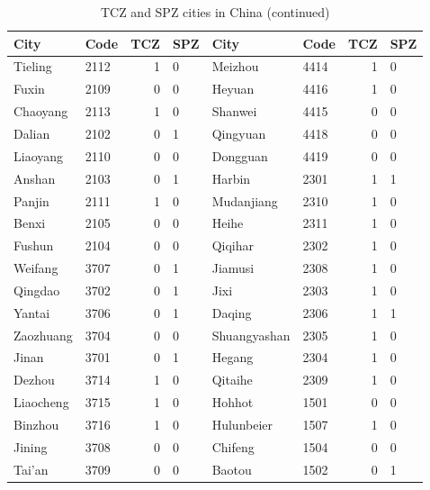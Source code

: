 \documentclass[12pt]{article}
\begin{document}
\begin{table}[!htb] \centering
  \caption{TCZ and SPZ cities in China (continued)}
  \begin{adjustbox}{width=\textwidth, totalheight=\baselineskip,keepaspectratio}
    \label{tab:appendix3}
\begin{tabular}{llrlllrl}
\hline
      City &  Code &  TCZ & SPZ &          City &  Code &  TCZ & SPZ \\
\midrule
   Tieling &  2112 &    1 &   0 &       Meizhou &  4414 &    1 &   0 \\
     Fuxin &  2109 &    0 &   0 &        Heyuan &  4416 &    1 &   0 \\
  Chaoyang &  2113 &    1 &   0 &       Shanwei &  4415 &    0 &   0 \\
    Dalian &  2102 &    0 &   1 &      Qingyuan &  4418 &    0 &   0 \\
  Liaoyang &  2110 &    0 &   0 &      Dongguan &  4419 &    0 &   0 \\
    Anshan &  2103 &    0 &   1 &        Harbin &  2301 &    1 &   1 \\
    Panjin &  2111 &    1 &   0 &    Mudanjiang &  2310 &    1 &   0 \\
     Benxi &  2105 &    0 &   0 &         Heihe &  2311 &    1 &   0 \\
    Fushun &  2104 &    0 &   0 &       Qiqihar &  2302 &    1 &   0 \\
   Weifang &  3707 &    0 &   1 &       Jiamusi &  2308 &    1 &   0 \\
   Qingdao &  3702 &    0 &   1 &          Jixi &  2303 &    1 &   0 \\
    Yantai &  3706 &    0 &   1 &        Daqing &  2306 &    1 &   1 \\
 Zaozhuang &  3704 &    0 &   0 &  Shuangyashan &  2305 &    1 &   0 \\
     Jinan &  3701 &    0 &   1 &        Hegang &  2304 &    1 &   0 \\
    Dezhou &  3714 &    1 &   0 &       Qitaihe &  2309 &    1 &   0 \\
 Liaocheng &  3715 &    1 &   0 &        Hohhot &  1501 &    0 &   0 \\
   Binzhou &  3716 &    1 &   0 &    Hulunbeier &  1507 &    1 &   0 \\
    Jining &  3708 &    0 &   0 &       Chifeng &  1504 &    0 &   0 \\
    Tai'an &  3709 &    0 &   0 &        Baotou &  1502 &    0 &   1 \\

\end{tabular}
\end{adjustbox}
\end{table}
\end{document}

